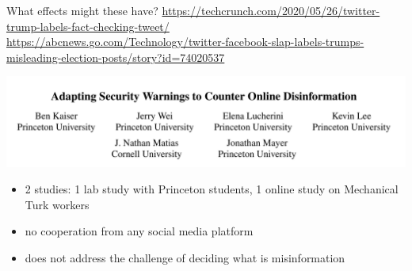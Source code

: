 \documentclass[aspectratio=169]{beamer}
\begin{document}
\begin{frame}

\setcounter{subfigure}{0}
\begin{figure}
  \centering
  \hspace{0in}
\end{figure}

What effects might these have?
\vfill
{\tiny \url{https://techcrunch.com/2020/05/26/twitter-trump-labels-fact-checking-tweet/}\\
\url{https://abcnews.go.com/Technology/twitter-facebook-slap-labels-trumps-misleading-election-posts/story?id=74020537}}

\end{frame}
\begin{frame}

\begin{center}
\includegraphics[width=\textwidth]{figures/kaiser_adapting_2020_title}
\end{center}

\begin{itemize}
\item 2 studies: 1 lab study with Princeton students, 1 online study on Mechanical Turk workers \pause
\item no cooperation from any social media platform \pause
\item does not address the challenge of deciding what is misinformation
\end{itemize}

\end{frame}
\end{document}
